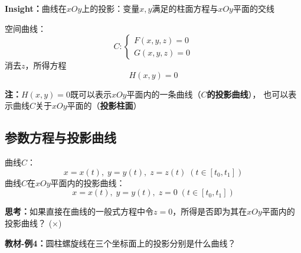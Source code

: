 \begin{center}
\end{center}

{\bf Insight：}曲线在$xOy$上的投影：变量$x,y$满足的柱面方程与$xOy$平面的交线

空间曲线：
$$C:\left\{\begin{array}{l}
	F(x,y,z)=0\\ G(x,y,z)=0
\end{array}\right.$$
消去$z$，所得方程
$$H(x,y)=0$$

{\bf 注：}$H(x,y)=0$既可以表示$xOy$平面内的一条曲线（{\bf $C$的投影曲线}），
也可以表示曲线$C$关于$xOy$平面的（{\bf 投影柱面}）

\subsection{参数方程与投影曲线}

{曲线$C$：}
$$x=x(t),\;y=y(t),\;z=z(t)\;(t\in[t_0,t_1])$$ 
{曲线$C$在$xOy$平面内的投影曲线：}
$$x=x(t),\;y=y(t),\;{z=0}\;(t\in[t_0,t_1])$$ 

{\bf 思考：}如果直接在曲线的一般式方程中令$z=0$，所得是否即为其在$xOy$平面内的投影曲线？
(${\times}$)

{\bf 教材-例4：}圆柱螺旋线在三个坐标面上的投影分别是什么曲线？

